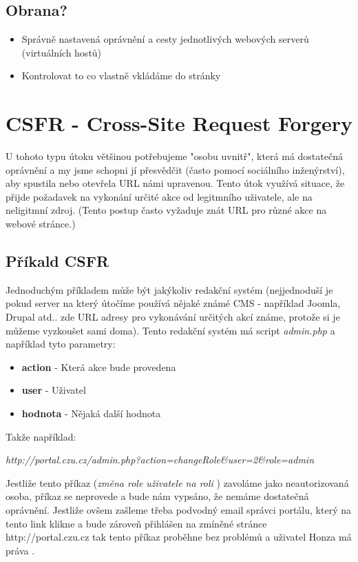 \documentclass[12pt, a4paper]{report}
\begin{document}
\subsection{Obrana?}
\begin{itemize}
\item Správně nastavená oprávnění a cesty jednotlivých webových serverů (virtuálních hostů)
\item Kontrolovat to co vlastně vkládáme do stránky
\end{itemize}

\section{CSFR - Cross-Site Request Forgery}
U tohoto typu útoku většinou potřebujeme "osobu uvnitř", která má dostatečná oprávnění a my jsme schopni jí přesvědčit (často pomocí sociálního inženýrství), aby spustila nebo otevřela URL námi upravenou. Tento útok využívá situace, že přijde požadavek na vykonání určité akce od legitmního uživatele, ale na neligitmní zdroj. (Tento postup často vyžaduje znát URL pro různé akce na webové stránce.)
\subsection{Příkald CSFR}
Jednoduchým příkladem může být jakýkoliv redakční systém (nejjednoduší je pokud server na který útočíme používá nějaké známé CMS - například Joomla, Drupal atd.. zde URL adresy pro vykonávání určitých akcí známe, protože si je můžeme vyzkoušet sami doma). Tento redakční systém má script \textit{admin.php} a například tyto parametry:
\begin{itemize}
\item \textbf{action} - Která akce bude provedena
\item \textbf{user} - Uživatel
\item \textbf{hodnota} - Nějaká další hodnota
\end{itemize}
Takže například:
\begin{center}
\textit{http://portal.czu.cz/admin.php?action=changeRole\&user=2\&role=admin}
\end{center}
Jestliže tento příkaz (\textit{změna role uživatele  na roli }) zavoláme jako neautorizovaná osoba, příkaz se neprovede a bude nám vypsáno, že nemáme dostatečná oprávnění. Jestliže ovšem zašleme třeba podvodný email správci portálu, který na tento link klikne a bude zároveň přihlášen na zmíněné stránce {http://portal.czu.cz} tak tento příkaz proběhne bez problémů a uživatel Honza má práva .
\end{document}
